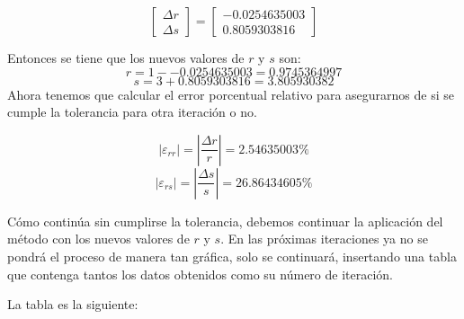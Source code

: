 \documentclass{article}
\begin{document}
\begin{equation*}
   \begin{bmatrix}
       \varDelta r \\
       \varDelta s 
   \end{bmatrix}
   =
   \begin{bmatrix}
       -0.0254635003  \\
       0.8059303816
   \end{bmatrix}
\end{equation*}


Entonces se tiene que los nuevos valores de $r$ y $s$ son:
\begin{equation*}
   r = 1 - -0.0254635003 = 0.9745364997
\end{equation*}
\begin{equation*}
   s = 3 + 0.8059303816 = 3.805930382
\end{equation*}
Ahora tenemos que calcular el error porcentual relativo para asegurarnos de si se cumple
la tolerancia para otra iteración o no.


\begin{equation*}
  |\varepsilon_{rr}|= |\frac{\varDelta r}{r}| = 2.54635003\%
\end{equation*}
\begin{equation*}
   |\varepsilon_{rs}| = |\frac{\varDelta s}{s}| = 26.86434605\%
\end{equation*}


Cómo continúa sin cumplirse la tolerancia, debemos continuar la aplicación del método con
los nuevos valores de $r$ y $s$. En las próximas iteraciones ya no se pondrá el proceso
de manera tan gráfica, solo se continuará, insertando una tabla que contenga tantos los
datos obtenidos como su número de iteración.


\newpage
La tabla es la siguiente:
\end{document}
